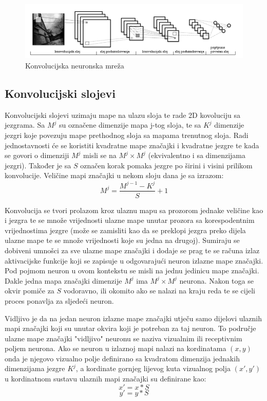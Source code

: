 \documentclass[times, utf8, zavrsni, numeric]{fer}
\begin{document}
\begin{figure}
    \centering
    \includegraphics[width=14cm]{img/konvolucijska-mreza.png}
    \caption{Konvolucijska neuronska mreža}
    \label{fig:konvolucijska-mreza}
\end{figure}

\subsection{Konvolucijski slojevi}
Konvolucijski slojevi uzimaju mape na ulazu sloja te rade 2D kovoluciju sa jezgrama. Sa $M^j$ su označene dimenzije mapa j-tog sloja, te sa $K^j$ dimenzije jezgri koje povezuju mape prethodnog sloja sa mapama trenutnog sloja. Radi jednostavnosti će se koristiti kvadratne mape značajki i kvadratne jezgre te kada se govori o dimenziji $M^j$ misli se na $M^j \times M^j$ (ekvivalentno i sa dimenzijama jezgri). Također je sa $S$ označen korak pomaka jezgre po širini i visini prilikom konvolucije. Veličine mapi značajki u nekom sloju dana je sa izrazom:
\begin{equation}
M^j = \frac{M^{j-1} - K^j}{S} + 1
\end{equation}

Konvolucija se tvori prolazom kroz ulaznu mapu sa prozorom jednake veličine kao i jezgra te se množe vrijednosti ulazne mape unutar prozora sa korespodentnim vrijednostima jezgre (može se zamisliti kao da se preklopi jezgra preko dijela ulazne mape te se množe vrijednosti koje su jedna na drugoj). Sumiraju se dobiveni umnošci za sve ulazne mape značajki i dodaje se prag te se računa izlaz aktivacijske funkcije koji se zapisuje u odgovarajući neuron izlazne mape značajki. Pod pojmom neuron u ovom kontekstu se misli na jednu jedinicu mape značajki. Dakle jedna mapa značajki dimenzije $M^j$ ima $M^j \times M^j$ neurona. Nakon toga se okvir pomiče za $S$ vodoravno, ili okomito ako se nalazi na kraju reda te se cijeli proces ponavlja za sljedeći neuron.

Vidljivo je da na jedan neuron izlazne mape značajki utječu samo dijelovi ulaznih mapi značajki koji su unutar okvira koji je potreban za taj neuron. To područje ulazne mape značajki "vidljivo" neuronu se naziva vizualnim ili receptivnim poljem neurona. Ako se neuron u izlaznoj mapi nalazi na kordinatama $(x, y)$ onda je njegovo vizualno polje definirano sa kvadratom dimenzija jednakih dimenzijama jezgre $K^j$, a kordinate gornjeg lijevog kuta vizualnog polja $(x', y')$ u kordinatnom sustavu ulaznih mapi značajki su definirane kao:
\begin{equation}
x' = x*S
\end{equation}
\begin{equation}
y' = y*S
\end{equation}
\end{document}
